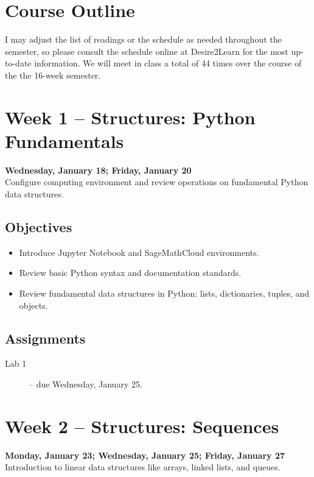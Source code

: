 \documentclass[10pt]{memoir}
\begin{document}

\newpage
\section{\textbf{Course Outline}}

I may adjust the list of readings or the schedule as needed throughout the semester, so please consult the schedule online at Desire2Learn for the most up-to-date information. We will meet in class a total of 44 times over the course of the the 16-week semester.


\section{Week 1 -- Structures: Python Fundamentals}
\textcolor{CUGold}{\textbf{Wednesday, January 18; Friday, January 20}}\\
Configure computing environment and review operations on fundamental Python data structures.
    
    \subsection{Objectives}
    \begin{itemize}
        \item Introduce Jupyter Notebook and SageMathCloud environments.
        \item Review basic Python syntax and documentation standards.
        \item Review fundamental data structures in Python: lists, dictionaries, tuples, and objects.
    \end{itemize}
    
    \subsection{Assignments}
    \begin{description}%
        \item[Lab 1 ] -- due Wednesday, January 25. 
    \end{description}

\section{Week 2 -- Structures: Sequences}
\textcolor{CUGold}{\textbf{Monday, January 23; Wednesday, January 25; Friday, January 27}}\\
Introduction to linear data structures like arrays, linked lists, and queues.
    
\end{document}
